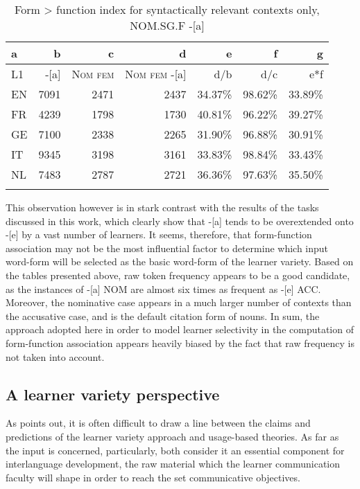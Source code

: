 \begin{table}
    \begin{tabularx}{\textwidth}{Xrrr rrr}
        \lsptoprule
        a & b & c & d & e & f & g\\
        \midrule
        L1 & {}-[a] & \textsc{Nom} \textsc{fem} & \textsc{Nom} \textsc{fem} -[a] & d/b & d/c & e*f\\
        EN & 7091 & 2471 & 2437 & 34.37\% & 98.62\% & 33.89\%\\
        FR & 4239 & 1798 & 1730 & 40.81\% & 96.22\% & 39.27\%\\
        GE & 7100 & 2338 & 2265 & 31.90\% & 96.88\% & 30.91\%\\
        IT & 9345 & 3198 & 3161 & 33.83\% & 98.84\% & 33.43\%\\
        NL & 7483 & 2787 & 2721 & 36.36\% & 97.63\% & 35.50\%\\
        \lspbottomrule
    \end{tabularx}
    \caption{Form > function index for syntactically relevant contexts only, NOM.SG.F -[a]}
    \label{tab:08:2}
\end{table}

This observation however is in stark contrast with the results of the tasks discussed in this work, which clearly show that -[a] tends to be overextended onto -[e] by a vast number of learners. It seems, therefore, that form-function association may not be the most influential factor to determine which input word-form will be selected as the basic word-form of the learner variety. Based on the tables presented above, raw token frequency appears to be a good candidate, as the instances of -[a] NOM are almost six times as frequent as -[e] ACC. Moreover, the nominative case appears in a much larger number of contexts than the accusative case, and is the default citation form of nouns. In sum, the approach adopted here in order to model learner selectivity in the computation of form-function association appears heavily biased by the fact that raw frequency is not taken into account.

\subsection{A learner variety perspective}\label{sec:08:1.3}

As \citet{Dimroth2018} points out, it is often difficult to draw a line between the claims and predictions of the learner variety approach and usage-based theories. As far as the input is concerned, particularly, both consider it an essential component for interlanguage development, the raw material which the learner communication faculty will shape in order to reach the set communicative objectives.

